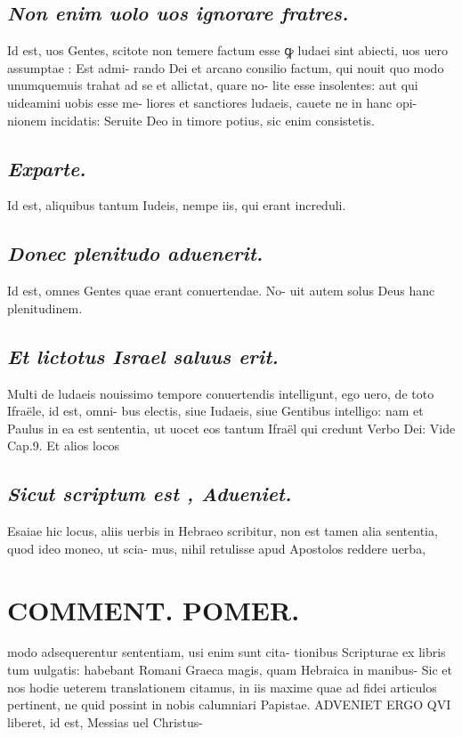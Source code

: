 \documentclass{article}
\begin{document}
\begin{pages}
\subsection*{\textit{Non enim uolo uos ignorare fratres. }}\pstart Id est, uos Gentes, scitote non temere factum esse ꝙ ludaei sint abiecti, uos uero assumptae : Est admi- rando Dei et arcano consilio factum, qui nouit quo modo unumquemuis trahat ad se et allictat, quare no- lite esse insolentes: aut qui uideamini uobis esse me- liores et sanctiores ludaeis, cauete ne in hanc opi- nionem incidatis: Seruite Deo in timore potius, sic enim consistetis.  \pend
{}
{}
\subsection*{\textit{Exparte. }}\pstart Id est, aliquibus tantum Iudeis, nempe iis, qui erant increduli.   \pend
{}
{}
\subsection*{\textit{Donec plenitudo aduenerit. }}\pstart Id est, omnes Gentes quae erant conuertendae. No- uit autem solus Deus hanc plenitudinem.  \pend
{}
{}
\subsection*{\textit{Et lictotus Israel saluus erit. }}\pstart Multi de ludaeis nouissimo tempore conuertendis intelligunt, ego uero, de toto Ifraële, id est, omni- bus electis, siue Iudaeis, siue Gentibus intelligo: nam et Paulus in ea est sententia, ut uocet eos tantum Ifraël qui credunt Verbo Dei: Vide Cap.9. Et alios locos  \pend
{}
{}
\subsection*{\textit{Sicut scriptum est , Adueniet. }}\pstart Esaiae hic locus, aliis uerbis in Hebraeo scribitur, non est tamen alia sententia, quod ideo moneo, ut scia- mus, nihil retulisse apud Apostolos reddere uerba,  \pend
\section*{COMMENT. POMER.  }\pstart modo adsequerentur sententiam, usi enim sunt cita- tionibus Scripturae ex libris tum uulgatis: habebant Romani Graeca magis, quam Hebraica in manibus- Sic et nos hodie ueterem translationem citamus, in iis maxime quae ad fidei articulos pertinent, ne quid possint in nobis calumniari Papistae. ADVENIET ERGO QVI liberet, id est, Messias uel Christus-  \pend
{}
{}

\end{pages}
\end{document}
